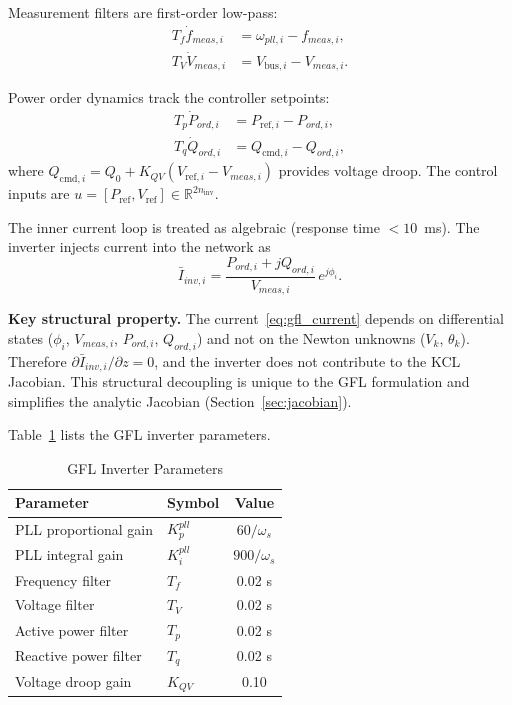 \documentclass[11pt]{article}
\newcommand{\R}{\mathbb{R}}
\begin{document}
Measurement filters are first-order low-pass:
\begin{align}
  T_f \dot{f}_{meas,i} &= \omega_{pll,i} - f_{meas,i},
    \label{eq:filt_f} \\
  T_V \dot{V}_{meas,i} &= V_{\mathrm{bus},i} - V_{meas,i}.
    \label{eq:filt_v}
\end{align}

Power order dynamics track the controller setpoints:
\begin{align}
  T_p \dot{P}_{ord,i} &= P_{\mathrm{ref},i} - P_{ord,i},
    \label{eq:pord} \\
  T_q \dot{Q}_{ord,i} &= Q_{\mathrm{cmd},i} - Q_{ord,i},
    \label{eq:qord}
\end{align}
where $Q_{\mathrm{cmd},i} = Q_0 + K_{QV}(V_{\mathrm{ref},i} - V_{meas,i})$
provides voltage droop.  The control inputs are
$u = [P_{\mathrm{ref}}, V_{\mathrm{ref}}] \in \R^{2n_{\mathrm{inv}}}$.

The inner current loop is treated as algebraic (response time
$< 10$~ms).  The inverter injects current into the network as
\begin{equation}
  \bar{I}_{inv,i} = \frac{P_{ord,i} + jQ_{ord,i}}{V_{meas,i}}
    \, e^{j\phi_i}.
  \label{eq:gfl_current}
\end{equation}

\textbf{Key structural property.}  The current~\eqref{eq:gfl_current}
depends on differential states ($\phi_i$, $V_{meas,i}$, $P_{ord,i}$,
$Q_{ord,i}$) and not on the Newton unknowns ($V_k$, $\theta_k$).
Therefore $\partial \bar{I}_{inv,i} / \partial z = 0$, and the
inverter does not contribute to the KCL Jacobian.  This structural
decoupling is unique to the GFL formulation and simplifies the
analytic Jacobian (Section~\ref{sec:jacobian}).

Table~\ref{tab:gfl_params} lists the GFL inverter parameters.

\begin{table}[t]
\centering
\caption{GFL Inverter Parameters}
\label{tab:gfl_params}
\small
\begin{tabular}{@{}llc@{}}
\toprule
Parameter & Symbol & Value \\
\midrule
PLL proportional gain  & $K_p^{pll}$  & $60/\omega_s$ \\
PLL integral gain      & $K_i^{pll}$  & $900/\omega_s$ \\
Frequency filter       & $T_f$        & 0.02 s \\
Voltage filter         & $T_V$        & 0.02 s \\
Active power filter    & $T_p$        & 0.02 s \\
Reactive power filter  & $T_q$        & 0.02 s \\
Voltage droop gain     & $K_{QV}$     & 0.10 \\
\bottomrule
\end{tabular}
\end{table}
\end{document}
